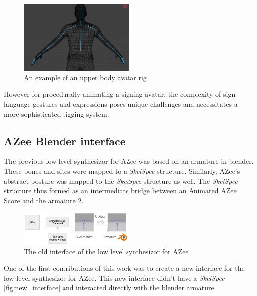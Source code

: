 \documentclass[../../main.tex]{subfiles}
\begin{document}
\begin{figure}[h]
    \centering
    \includegraphics[width=0.5\textwidth]{chapters/rigging_layers/images/upper_body_avatar.png}
    \caption{An example of an upper body avatar rig}
    \label{ref:upper_body_avatar}
\end{figure}

However for procedurally animating a signing avatar, the complexity of sign language gestures and expressions poses unique challenges and necessitates a more sophisticated rigging system.

\subsection{AZee Blender interface}
\label{ch:rigging_layers:proc_rig_signing_avatars:azee_blender_interface}

The previous low level synthesizor for AZee \cite{fabrizio} was based on an armature in blender. These bones and sites were mapped to a \emph{SkelSpec} structure. Similarly, AZee's abstract posture was mapped to the \emph{SkelSpec} structure as well. The \emph{SkelSpec} structure thus formed as an intermediate bridge between an Animated AZee Score and the armature \ref{fig:old_interface}. 

\begin{figure}
    \centering
    \includegraphics[width=0.5\textwidth]{chapters/rigging_layers/images/old_interface.png}
    \caption{The old interface of the low level synthesizor for AZee}
    \label{fig:old_interface}
\end{figure}

One of the first contributions of this work was to create a new interface for the low level synthesizor for AZee. This new interface didn't have a \emph{SkelSpec} \ref{fig:new_interface} and interacted directly with the blender armature. 
\end{document}
